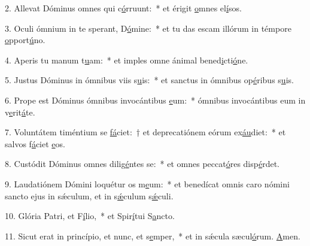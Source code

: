 2. Allevat Dóminus omnes qui c\uline{ó}rruunt:~* et érigit \uline{o}mnes el\uline{í}sos.\par 
3. Oculi ómnium in te sperant, D\uline{ó}mine:~* et tu das escam illórum in témpore \uline{o}pport\uline{ú}no.\par 
4. Aperis tu manum t\uline{u}am:~* et imples omne ánimal bened\uline{i}cti\uline{ó}ne.\par 
5. Justus Dóminus in ómnibus viis s\uline{u}is:~* et sanctus in ómnibus op\uline{é}ribus s\uline{u}is.\par 
6. Prope est Dóminus ómnibus invocántibus \uline{e}um:~* ómnibus invocántibus eum in v\uline{e}rit\uline{á}te.\par 
7. Voluntátem timéntium se \uline{fá}ciet:~† et deprecatiónem eórum ex\uline{áu}diet:~* et salvos f\uline{á}ciet \uline{e}os.\par 
8. Custódit Dóminus omnes dilig\uline{é}ntes se:~* et omnes peccat\uline{ó}res disp\uline{é}rdet.\par 
9. Laudatiónem Dómini loquétur os m\uline{e}um:~* et benedícat omnis caro nómini sancto ejus in sǽculum, et in s\uline{ǽ}culum s\uline{ǽ}culi.\par 
10. Glória Patri, et F\uline{í}lio,~* et Spir\uline{í}tui S\uline{a}ncto.\par 
11. Sicut erat in princípio, et nunc, et s\uline{e}mper,~* et in sǽcula sæcul\uline{ó}rum. \uline{A}men.\par 

